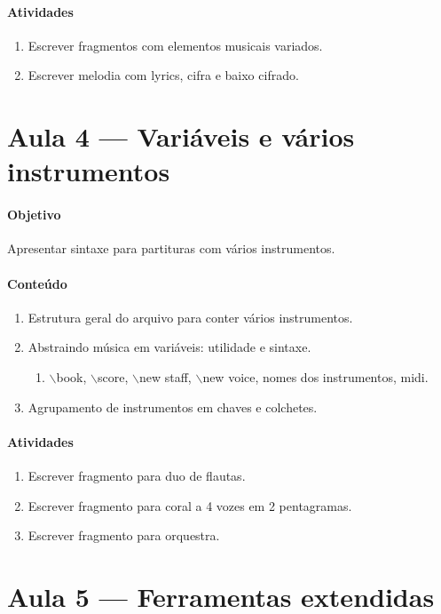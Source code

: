 \documentclass[12pt,brazil]{article}
\begin{document}
\paragraph{Atividades}
\begin{enumerate}
\item Escrever fragmentos com elementos musicais variados.
\item Escrever melodia com lyrics, cifra e baixo cifrado.
\end{enumerate}

\section{Aula 4 --- Variáveis e vários instrumentos}
\paragraph{Objetivo}
Apresentar sintaxe para partituras com vários instrumentos.
\paragraph{Conteúdo}
\begin{enumerate}
\item Estrutura geral do arquivo para conter vários instrumentos.
\item Abstraindo música em variáveis: utilidade e sintaxe.
  \begin{enumerate}
  \item $\backslash$book, $\backslash$score, $\backslash$new staff,
    $\backslash$new voice, nomes dos instrumentos, midi.
  \end{enumerate}
\item Agrupamento de instrumentos em chaves e colchetes.
\end{enumerate}
\paragraph{Atividades}
\begin{enumerate}
\item Escrever fragmento para duo de flautas.
\item Escrever fragmento para coral a 4 vozes em 2 pentagramas.
\item Escrever fragmento para orquestra.
\end{enumerate}

\section{Aula 5 --- Ferramentas extendidas}
\end{document}
